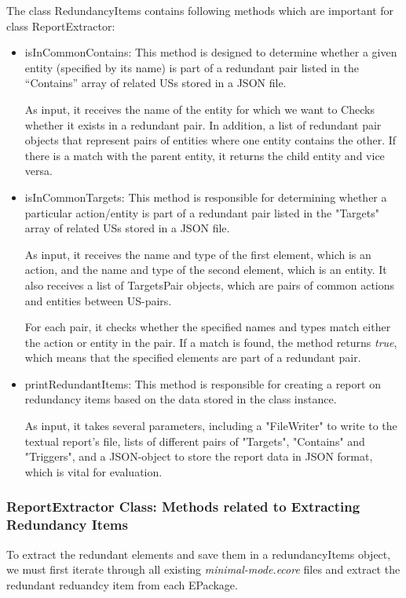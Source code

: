 The class RedundancyItems contains following methods which are important for class ReportExtractor:
\begin{itemize}
	\item isInCommonContains: This method is designed to determine whether a given entity (specified by its name) is part of a redundant pair listed in the \enquote{Contains} array of related USs stored in a JSON file.
	
	As input, it receives the name of the entity for which we want to Checks whether it exists in a redundant pair. In addition, a list of redundant pair objects that represent pairs of entities where one entity contains the other. If there is a match with the parent entity, it returns the child entity and vice versa.
	\item isInCommonTargets: This method is responsible for determining whether a particular action/entity is part of a redundant pair listed in the "Targets" array of related USs stored in a JSON file.
	
	As input, it receives the name and type of the first element, which is an action, and the name and type of the second element, which is an entity. It also receives a list of TargetsPair objects, which are pairs of common actions and entities between US-pairs.
	
	For each pair, it checks whether the specified names and types match either the action or entity in the pair. If a match is found, the method returns \textit{true}, which means that the specified elements are part of a redundant pair.
	\item printRedundantItems: This method is responsible for creating a report on redundancy items based on the data stored in the class instance. 
	
	As input, it takes several parameters, including a "FileWriter" to write to the textual report's file, lists of different pairs of "Targets", "Contains" and "Triggers", and a JSON-object to store the report data in JSON format, which is vital for evaluation.
\end{itemize}
\subsubsection*{ReportExtractor Class: Methods related to Extracting Redundancy Items}
To extract the redundant elements and save them in a redundancyItems object, we must first iterate through all existing \textit{minimal-mode.ecore} files and extract the redundant reduandcy item from each EPackage.

